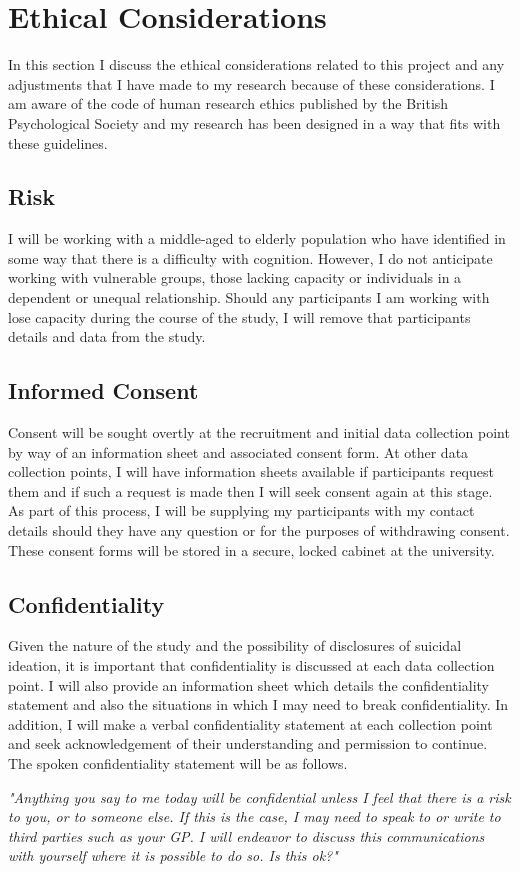 \documentclass[10pt, letterpaper, twoside, openany]{book}
\begin{document}
\section{Ethical Considerations}
In this section I discuss the ethical considerations related to this project and any adjustments that I have made to my research because of these considerations. I am aware of the code of human  research ethics published by the British Psychological Society \cite{BritishPsychologicalSociety2014} and my research has been designed in a way that fits with these guidelines.
\subsection{Risk}
I will be working with a middle-aged to elderly population who have identified in some way that there is a difficulty with cognition. However, I do not anticipate working with vulnerable groups, those lacking capacity or individuals in a dependent or unequal relationship. Should any participants I am working with lose capacity during the course of the study, I will remove that participants details and data from the study.
\subsection{Informed Consent}
Consent will be sought overtly at the recruitment and initial data collection point by way of an information sheet and associated consent form. At other data collection points, I will have information sheets available if participants request them and if such a request is made then I will seek consent again at this stage. As part of this process, I will be supplying my participants with my contact details should they have any question or for the purposes of withdrawing consent. These consent forms will be stored in a secure, locked cabinet at the university. 
\subsection{Confidentiality}
Given the nature of the study and the possibility of disclosures of suicidal ideation, it is important that confidentiality is discussed at each data collection point. I will also provide an information sheet which details the confidentiality statement and also the situations in which I may need to break confidentiality. In addition, I will make a verbal confidentiality statement at each collection point and seek acknowledgement of their understanding and permission to continue. The spoken confidentiality statement will be as follows.
\begin{center}
	\textit{"Anything you say to me today will be confidential unless I feel that there is a risk to you, or to someone else. If this is the case, I may need to speak to or write to third parties such as your GP. I will endeavor to discuss this communications with yourself where it is possible to do so. Is this ok?"}
\end{center}
\end{document}
